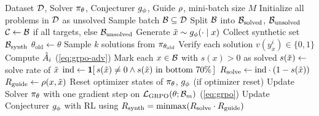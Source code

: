 \begin{algorithm}[tb]
  \caption{SGS-GRPO (off-policy Solver update)}
  \label{alg:sgs-grpo}
  \begin{algorithmic}[1]
     Dataset $\mathcal{D}$, Solver $\pi_\theta$, Conjecturer $g_\phi$, Guide $\rho$, mini-batch size $M$
    \STATE Initialize all problems in $\mathcal{D}$ as unsolved
      \STATE Sample batch $\mathcal{B} \subseteq \mathcal{D}$
      \STATE Split $\mathcal{B}$ into $\mathcal{B}_{\mathrm{solved}}$, $\mathcal{B}_{\mathrm{unsolved}}$
      \STATE $\mathcal{C} \leftarrow \mathcal{B}$ if all targets, else $\mathcal{B}_{\mathrm{unsolved}}$
        \STATE Generate $\tilde{x} \sim g_\phi(\cdot \mid x)$
      \ENDFOR
      \STATE Collect synthetic set $\mathcal{B}_{\mathrm{synth}}$
      \STATE $\theta_{\mathrm{old}} \leftarrow \theta$
        \STATE Sample $k$ solutions from $\pi_{\theta_{\mathrm{old}}}$
        \STATE Verify each solution $v(y_x^i) \in \{0,1\}$
        \STATE Compute $\hat{A}_i$ (\cref{eq:grpo-adv})
      \ENDFOR
      \STATE Mark each $x \in \mathcal{B}$ with $s(x) > 0$ as solved
        \STATE $s(\tilde{x}) \leftarrow$ solve rate of $\tilde{x}$
        \STATE $\text{ind} \leftarrow \mathbf{1}[\, s(\tilde{x}) \neq 0 \land s(\tilde{x}) \text{ in bottom } 70\% \,]$
        \STATE $R_{\text{solve}} \leftarrow \text{ind} \cdot (1 - s(\tilde{x}))$
        \STATE $R_{\text{guide}} \leftarrow \rho(x, \tilde{x})$
      \ENDFOR
      \STATE Reset optimizer states of $\pi_\theta$, $g_\phi$ (if optimizer reset)
        \STATE Update Solver $\pi_\theta$ with one gradient step on $\mathcal{L}_{\mathrm{GRPO}}(\theta; \mathcal{B}_m)$ (\cref{eq:grpo})
      \ENDFOR
      \STATE Update Conjecturer $g_\phi$ with RL using $R_{\text{synth}} = \operatorname{minmax}(R_{\text{solve}} \cdot R_{\text{guide}})$
    \ENDFOR
  \end{algorithmic}
\end{algorithm}

